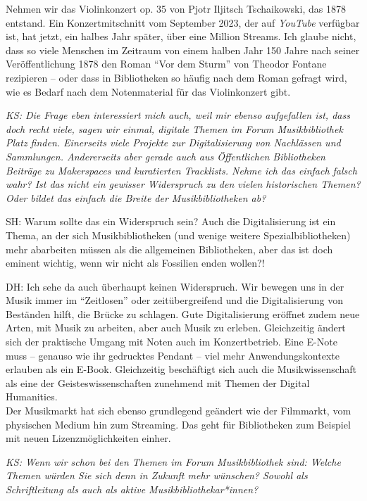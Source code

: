 \documentclass[a4paper,
fontsize=11pt,
oneside,
numbers=noperiodatend,
parskip=half-,
bibliography=totoc,
final
]{scrartcl}
\begin{document}
Nehmen wir das Violinkonzert op. 35 von Pjotr Iljitsch Tschaikowski, das
1878 entstand. Ein Konzertmitschnitt vom September 2023, der auf
\emph{YouTube} verfügbar ist, hat jetzt, ein halbes Jahr später, über
eine Million Streams. Ich glaube nicht, dass so viele Menschen im
Zeitraum von einem halben Jahr 150 Jahre nach seiner Veröffentlichung
1878 den Roman \enquote{Vor dem Sturm} von Theodor Fontane rezipieren --
oder dass in Bibliotheken so häufig nach dem Roman gefragt wird, wie es
Bedarf nach dem Notenmaterial für das Violinkonzert gibt.

\emph{KS: Die Frage eben interessiert mich auch, weil mir ebenso
aufgefallen ist, dass doch recht viele, sagen wir einmal, digitale
Themen im Forum Musikbibliothek Platz finden. Einerseits viele Projekte
zur Digitalisierung von Nachlässen und Sammlungen. Andererseits aber
gerade auch aus Öffentlichen Bibliotheken Beiträge zu Makerspaces und
kuratierten Tracklists. Nehme ich das einfach falsch wahr? Ist das nicht
ein gewisser Widerspruch zu den vielen historischen Themen? Oder bildet
das einfach die Breite der Musikbibliotheken ab?}

SH: Warum sollte das ein Widerspruch sein? Auch die Digitalisierung ist
ein Thema, an der sich Musikbibliotheken (und wenige weitere
Spezialbibliotheken) mehr abarbeiten müssen als die allgemeinen
Bibliotheken, aber das ist doch eminent wichtig, wenn wir nicht als
Fossilien enden wollen?!

DH: Ich sehe da auch überhaupt keinen Widerspruch. Wir bewegen uns in
der Musik immer im \enquote{Zeitlosen} oder zeitübergreifend und die
Digitalisierung von Beständen hilft, die Brücke zu schlagen. Gute
Digitalisierung eröffnet zudem neue Arten, mit Musik zu arbeiten, aber
auch Musik zu erleben. Gleichzeitig ändert sich der praktische Umgang
mit Noten auch im Konzertbetrieb. Eine E-Note muss -- genauso wie ihr
gedrucktes Pendant -- viel mehr Anwendungskontexte erlauben als ein
E-Book. Gleichzeitig beschäftigt sich auch die Musikwissenschaft als
eine der Geisteswissenschaften zunehmend mit Themen der Digital
Humanities.\\
Der Musikmarkt hat sich ebenso grundlegend geändert wie der Filmmarkt,
vom physischen Medium hin zum Streaming. Das geht für Bibliotheken zum
Beispiel mit neuen Lizenzmöglichkeiten einher.

\emph{KS: Wenn wir schon bei den Themen im Forum Musikbibliothek sind:
Welche Themen würden Sie sich denn in Zukunft mehr wünschen? Sowohl als
Schriftleitung als auch als aktive Musikbibliothekar*innen?}
\end{document}
